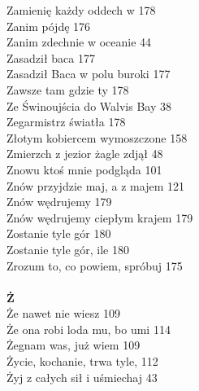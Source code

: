 \documentclass[a5paper, 10pt]{book}
\begin{document}
{\begin{multicols}{3}
    Zamienię każdy oddech w 178\\
    Zanim pójdę 176\\
    Zanim zdechnie w oceanie 44\\
    Zasadził baca 177\\
    Zasadził Baca w polu buroki 177\\
    Zawsze tam gdzie ty 178\\
    Ze Świnoujścia do Walvis Bay 38\\
    Zegarmistrz światła 178\\
    Złotym kobiercem wymoszczone 158\\
    Zmierzch z jezior żagle zdjął 48\\
    Znowu ktoś mnie podgląda 101\\
    Znów przyjdzie maj, a z majem 121\\
    Znów wędrujemy 179\\
    Znów wędrujemy ciepłym krajem 179\\
    Zostanie tyle gór 180\\
    Zostanie tyle gór, ile 180\\
    Zrozum to, co powiem, spróbuj 175\\
    \\
    {\footnotesize \textbf{Ż\\} }
    Że nawet nie wiesz 109\\
    Że ona robi loda mu, bo umi 114\\
    Żegnam was, już wiem 109\\
    Życie, kochanie, trwa tyle, 112\\
    Żyj z całych sił i uśmiechaj 43\\
    
  \end{multicols}
}
\end{document}
